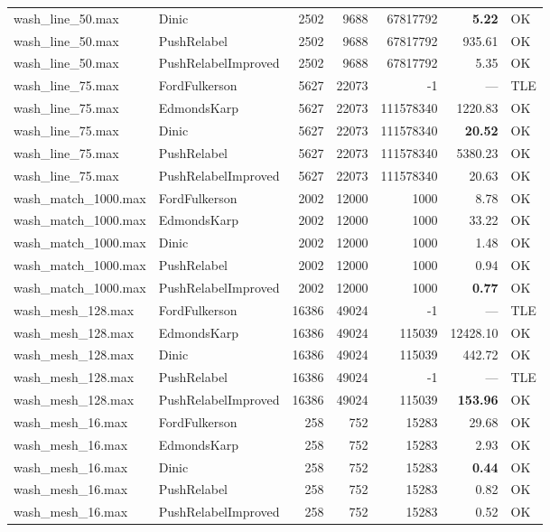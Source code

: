 \begin{longtable}{llrrrrl}
wash\_line\_50.max & Dinic & 2502 & 9688 & 67817792 & \textbf{5.22} & OK \\
wash\_line\_50.max & PushRelabel & 2502 & 9688 & 67817792 & 935.61 & OK \\
wash\_line\_50.max & PushRelabelImproved & 2502 & 9688 & 67817792 & 5.35 & OK \\
\midrule
wash\_line\_75.max & FordFulkerson & 5627 & 22073 & -1 & --- & TLE \\
wash\_line\_75.max & EdmondsKarp & 5627 & 22073 & 111578340 & 1220.83 & OK \\
wash\_line\_75.max & Dinic & 5627 & 22073 & 111578340 & \textbf{20.52} & OK \\
wash\_line\_75.max & PushRelabel & 5627 & 22073 & 111578340 & 5380.23 & OK \\
wash\_line\_75.max & PushRelabelImproved & 5627 & 22073 & 111578340 & 20.63 & OK \\
\midrule
wash\_match\_1000.max & FordFulkerson & 2002 & 12000 & 1000 & 8.78 & OK \\
wash\_match\_1000.max & EdmondsKarp & 2002 & 12000 & 1000 & 33.22 & OK \\
wash\_match\_1000.max & Dinic & 2002 & 12000 & 1000 & 1.48 & OK \\
wash\_match\_1000.max & PushRelabel & 2002 & 12000 & 1000 & 0.94 & OK \\
wash\_match\_1000.max & PushRelabelImproved & 2002 & 12000 & 1000 & \textbf{0.77} & OK \\
\midrule
wash\_mesh\_128.max & FordFulkerson & 16386 & 49024 & -1 & --- & TLE \\
wash\_mesh\_128.max & EdmondsKarp & 16386 & 49024 & 115039 & 12428.10 & OK \\
wash\_mesh\_128.max & Dinic & 16386 & 49024 & 115039 & 442.72 & OK \\
wash\_mesh\_128.max & PushRelabel & 16386 & 49024 & -1 & --- & TLE \\
wash\_mesh\_128.max & PushRelabelImproved & 16386 & 49024 & 115039 & \textbf{153.96} & OK \\
\midrule
wash\_mesh\_16.max & FordFulkerson & 258 & 752 & 15283 & 29.68 & OK \\
wash\_mesh\_16.max & EdmondsKarp & 258 & 752 & 15283 & 2.93 & OK \\
wash\_mesh\_16.max & Dinic & 258 & 752 & 15283 & \textbf{0.44} & OK \\
wash\_mesh\_16.max & PushRelabel & 258 & 752 & 15283 & 0.82 & OK \\
wash\_mesh\_16.max & PushRelabelImproved & 258 & 752 & 15283 & 0.52 & OK \\

\end{longtable}
